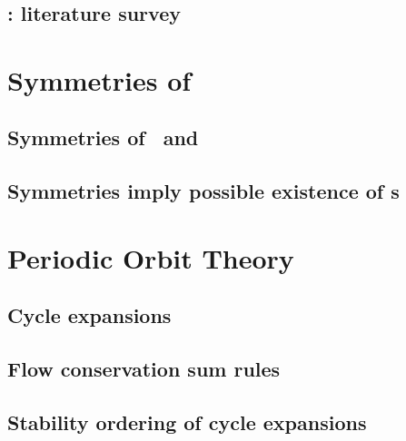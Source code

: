 \documentclass[hyperref]{inputs/gatech-thesis}
\begin{document}
\chapter{\KSe}
\label{chap:pCf}

    \section{\KS: literature survey}
        \label{sec:KSlit}
        


\chapter{Symmetries of \KS}
\label{chap:Symmetry}

    \section{Symmetries of \eqva\ and \reqva}

    \section{Symmetries imply possible existence of \rpo s}
        \label{sec:SymRPO}
        

\chapter{Periodic Orbit Theory}
\label{chap:POT}

    \section{Cycle expansions}

    \section{Flow conservation sum rules}
        \label{s-Cons-m-flow}
        

    \section{Stability ordering of cycle expansions}
        \label{s-StabOrd}
        


\end{document}
